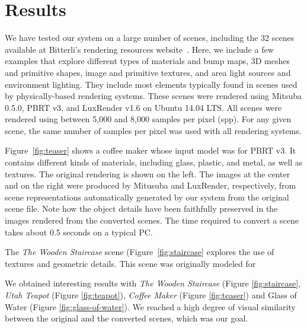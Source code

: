 \section{Results}
\label{sec:results}

We have tested our system on a large number of scenes, including the 32 scenes available
at Bitterli's rendering resources website~\cite{resources16}. 
Here, we include a few examples that explore different 
types of materials and bump maps, 3D meshes and primitive shapes, image and 
primitive textures, and area light sources and environment lighting. They include most elements typically found in scenes used by physically-based rendering systems.
% 
%
These scenes were rendered using Mitsuba 0.5.0, PBRT v3, and LuxRender v1.6 on 
Ubuntu 14.04 LTS. All scenes were rendered using between 5,000 and 8,000 samples per pixel (spp). For any given scene,
the same number of samples per pixel was used with all rendering systems. 

Figure~\ref{fig:teaser} shows a coffee maker whose input model was for PBRT v3. It contains different kinds of materials, including glass, plastic, and metal, as well as textures.  The original rendering is shown on the left. The images at the center and on the right were produced by Mitusuba and LuxRender, respectively, from scene representations automatically generated by our system from the original scene file. Note how the object details have been faithfully preserved in the images rendered from the converted scenes. The time required to convert a scene takes about 0.5 seconds on a typical PC.

The \textit{The Wooden Staircase} scene (Figure~\ref{fig:staircase} explores the use of textures and geometric details. This scene was originally modeled for 

We obtained interesting results with \textit{The Wooden Staircase} (Figure 
\ref{fig:staircase}, \textit{Utah Teapot} (Figure \ref{fig:teapot}), 
\textit{Coffee Maker} (Figure \ref{fig:teaser}) and Glass of Water (Figure 
\ref{fig:glass-of-water}). We reached a high degree of visual similarity between 
the original and the converted scenes, which was our goal.

